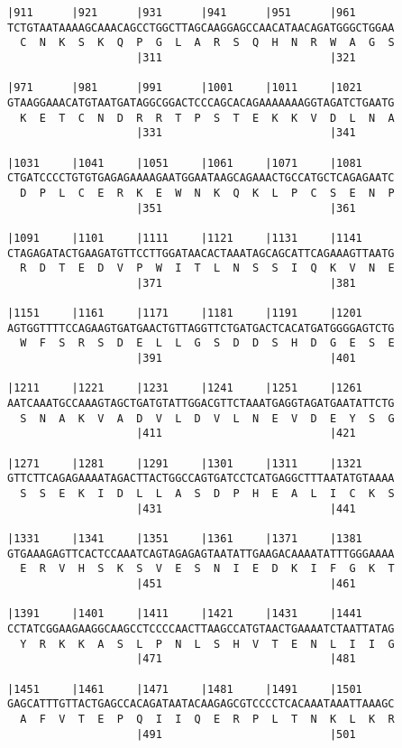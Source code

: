 \documentclass{article}
\begin{document}
\begin{Verbatim}
|911      |921      |931      |941      |951      |961      
TCTGTAATAAAAGCAAACAGCCTGGCTTAGCAAGGAGCCAACATAACAGATGGGCTGGAA
  C  N  K  S  K  Q  P  G  L  A  R  S  Q  H  N  R  W  A  G  S
                    |311                          |321      
  
|971      |981      |991      |1001     |1011     |1021     
GTAAGGAAACATGTAATGATAGGCGGACTCCCAGCACAGAAAAAAAGGTAGATCTGAATG
  K  E  T  C  N  D  R  R  T  P  S  T  E  K  K  V  D  L  N  A
                    |331                          |341      
  
|1031     |1041     |1051     |1061     |1071     |1081     
CTGATCCCCTGTGTGAGAGAAAAGAATGGAATAAGCAGAAACTGCCATGCTCAGAGAATC
  D  P  L  C  E  R  K  E  W  N  K  Q  K  L  P  C  S  E  N  P
                    |351                          |361      
  
|1091     |1101     |1111     |1121     |1131     |1141     
CTAGAGATACTGAAGATGTTCCTTGGATAACACTAAATAGCAGCATTCAGAAAGTTAATG
  R  D  T  E  D  V  P  W  I  T  L  N  S  S  I  Q  K  V  N  E
                    |371                          |381      
  
|1151     |1161     |1171     |1181     |1191     |1201     
AGTGGTTTTCCAGAAGTGATGAACTGTTAGGTTCTGATGACTCACATGATGGGGAGTCTG
  W  F  S  R  S  D  E  L  L  G  S  D  D  S  H  D  G  E  S  E
                    |391                          |401      
  
|1211     |1221     |1231     |1241     |1251     |1261     
AATCAAATGCCAAAGTAGCTGATGTATTGGACGTTCTAAATGAGGTAGATGAATATTCTG
  S  N  A  K  V  A  D  V  L  D  V  L  N  E  V  D  E  Y  S  G
                    |411                          |421      
  
|1271     |1281     |1291     |1301     |1311     |1321     
GTTCTTCAGAGAAAATAGACTTACTGGCCAGTGATCCTCATGAGGCTTTAATATGTAAAA
  S  S  E  K  I  D  L  L  A  S  D  P  H  E  A  L  I  C  K  S
                    |431                          |441      
  
|1331     |1341     |1351     |1361     |1371     |1381     
GTGAAAGAGTTCACTCCAAATCAGTAGAGAGTAATATTGAAGACAAAATATTTGGGAAAA
  E  R  V  H  S  K  S  V  E  S  N  I  E  D  K  I  F  G  K  T
                    |451                          |461      
  
|1391     |1401     |1411     |1421     |1431     |1441     
CCTATCGGAAGAAGGCAAGCCTCCCCAACTTAAGCCATGTAACTGAAAATCTAATTATAG
  Y  R  K  K  A  S  L  P  N  L  S  H  V  T  E  N  L  I  I  G
                    |471                          |481      
  
|1451     |1461     |1471     |1481     |1491     |1501     
GAGCATTTGTTACTGAGCCACAGATAATACAAGAGCGTCCCCTCACAAATAAATTAAAGC
  A  F  V  T  E  P  Q  I  I  Q  E  R  P  L  T  N  K  L  K  R
                    |491                          |501      
  

\end{Verbatim}
\end{document}
